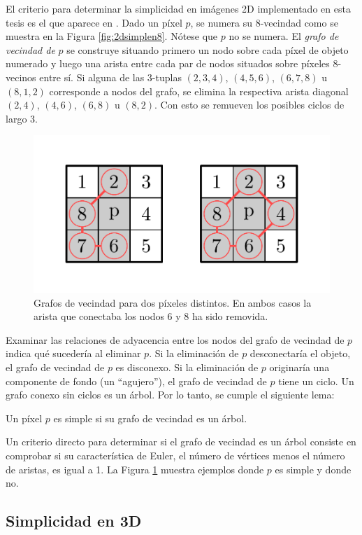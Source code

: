El criterio para determinar la simplicidad en imágenes 2D implementado en esta tesis es el que aparece en \cite{siddiqi2002hamilton}. Dado un píxel $p$, se numera su 8-vecindad como se muestra en la Figura \ref{fig:2dsimplen8}. Nótese que $p$ no se numera. El \textit{grafo de vecindad de} $p$ se construye situando primero un nodo sobre cada píxel de objeto numerado y luego una arista entre cada par de nodos situados sobre píxeles 8-vecinos entre sí. Si alguna de las 3-tuplas $(2, 3, 4)$, $(4, 5, 6)$, $(6, 7, 8)$ u $(8, 1, 2)$ corresponde a nodos del grafo, se elimina la respectiva arista diagonal $(2, 4)$, $(4, 6)$, $(6, 8)$ u $(8, 2)$. Con esto se remueven los posibles ciclos de largo 3.

\begin{figure}[ht]\centering
\includegraphics[width=0.6\linewidth]{images/2dsimpletestgraphcases}
\caption{Grafos de vecindad para dos píxeles distintos. En ambos casos la arista que conectaba los nodos 6 y 8 ha sido removida.}
\label{fig:2dsimpleexamples}
\end{figure}

Examinar las relaciones de adyacencia entre los nodos del grafo de vecindad de $p$ indica qué sucedería al eliminar $p$. Si la eliminación de $p$ desconectaría el objeto, el grafo de vecindad de $p$ es disconexo. Si la eliminación de $p$ originaría una componente de fondo (un ``agujero''), el grafo de vecindad de $p$ tiene un ciclo. Un grafo conexo sin ciclos es un árbol. Por lo tanto, se cumple el siguiente lema:

\begin{prop}
Un píxel $p$ es simple si su grafo de vecindad es un árbol.
\end{prop}

Un criterio directo para determinar si el grafo de vecindad es un árbol consiste en comprobar si su característica de Euler, el número de vértices menos el número de aristas, es igual a 1. La Figura \ref{fig:2dsimpleexamples} muestra ejemplos donde $p$ es simple y donde no.

\subsection{Simplicidad en 3D}


